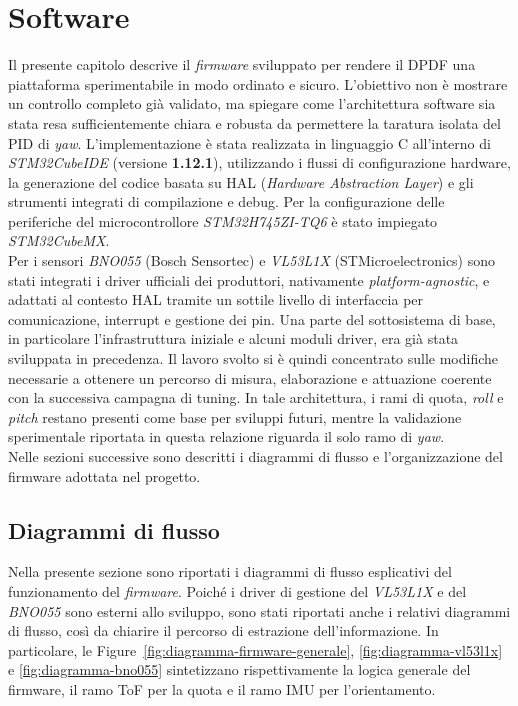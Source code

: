 \documentclass[11pt]{report}
\begin{document}
	\chapter{Software}
	Il presente capitolo descrive il \textit{firmware} sviluppato per rendere il DPDF una piattaforma sperimentabile in modo ordinato e sicuro. L'obiettivo non è mostrare un controllo completo già validato, ma spiegare come l'architettura software sia stata resa sufficientemente chiara e robusta da permettere la taratura isolata del PID di \textit{yaw}.
	L'implementazione è stata realizzata in linguaggio C all'interno di \textit{STM32CubeIDE} (versione \textbf{1.12.1}), utilizzando i flussi di configurazione hardware, la generazione del codice basata su HAL (\textit{Hardware Abstraction Layer}) e gli strumenti integrati di compilazione e debug. Per la configurazione delle periferiche del microcontrollore \textit{STM32H745ZI-TQ6} è stato impiegato \textit{STM32CubeMX}.\\
	Per i sensori \textit{BNO055} (Bosch Sensortec) e \textit{VL53L1X} (STMicroelectronics) sono stati integrati i driver ufficiali dei produttori, nativamente \textit{platform-agnostic}, e adattati al contesto HAL tramite un sottile livello di interfaccia per comunicazione, interrupt e gestione dei pin.
	Una parte del sottosistema di base, in particolare l'infrastruttura iniziale e alcuni moduli driver, era già stata sviluppata in precedenza. Il lavoro svolto si è quindi concentrato sulle modifiche necessarie a ottenere un percorso di misura, elaborazione e attuazione coerente con la successiva campagna di tuning. In tale architettura, i rami di quota, \textit{roll} e \textit{pitch} restano presenti come base per sviluppi futuri, mentre la validazione sperimentale riportata in questa relazione riguarda il solo ramo di \textit{yaw}.\\
	Nelle sezioni successive sono descritti i diagrammi di flusso e l'organizzazione del firmware adottata nel progetto.
	
	\section{Diagrammi di flusso}
	Nella presente sezione sono riportati i diagrammi di flusso esplicativi del funzionamento del \textit{firmware}. Poiché i driver di gestione del \textit{VL53L1X} e del \textit{BNO055} sono esterni allo sviluppo, sono stati riportati anche i relativi diagrammi di flusso, così da chiarire il percorso di estrazione dell'informazione. In particolare, le Figure~\ref{fig:diagramma-firmware-generale}, \ref{fig:diagramma-vl53l1x} e \ref{fig:diagramma-bno055} sintetizzano rispettivamente la logica generale del firmware, il ramo ToF per la quota e il ramo IMU per l'orientamento.
	
\end{document}

